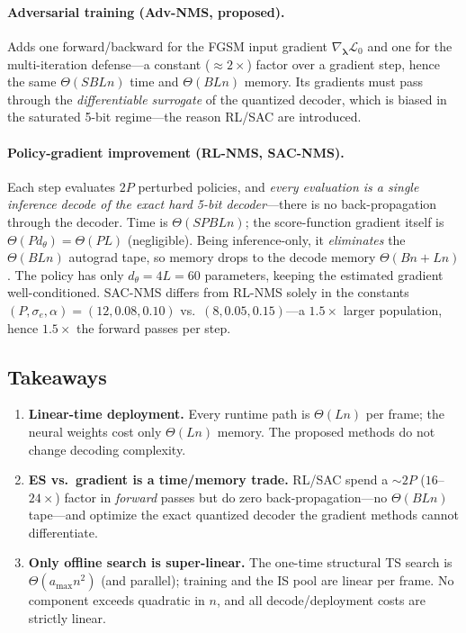\paragraph{Adversarial training (Adv-NMS, proposed).}
Adds one forward/backward for the FGSM input gradient
$\nabla_{\boldsymbol\lambda}\mathcal L_0$ and one for the multi-iteration
defense---a constant ($\approx\!2\times$) factor over a gradient step, hence the
same $\Theta(SBLn)$ time and $\Theta(BLn)$ memory. Its gradients must pass
through the \emph{differentiable surrogate} of the quantized decoder, which is
biased in the saturated 5-bit regime---the reason RL/SAC are introduced.

\paragraph{Policy-gradient improvement (RL-NMS, SAC-NMS).}
Each step evaluates $2P$ perturbed policies, and \emph{every evaluation is a
single inference decode of the exact hard 5-bit decoder}---there is no
back-propagation through the decoder. Time is $\Theta(SPBLn)$; the
score-function gradient itself is $\Theta(P d_\theta)=\Theta(PL)$ (negligible).
Being inference-only, it \emph{eliminates} the $\Theta(BLn)$ autograd tape, so
memory drops to the decode memory $\Theta(Bn+Ln)$. The policy has only
$d_\theta=4L=60$ parameters, keeping the estimated gradient well-conditioned.
SAC-NMS differs from RL-NMS solely in the constants
$(P,\sigma_e,\alpha)=(12,0.08,0.10)$ vs.\ $(8,0.05,0.15)$---a $1.5\times$ larger
population, hence $1.5\times$ the forward passes per step.

\subsection{Takeaways}
\begin{enumerate}
\item \textbf{Linear-time deployment.} Every runtime path is $\Theta(Ln)$ per
frame; the neural weights cost only $\Theta(Ln)$ memory. The proposed methods do
not change decoding complexity.
\item \textbf{ES vs.\ gradient is a time/memory trade.} RL/SAC spend a $\sim\!2P$
($16$--$24\times$) factor in \emph{forward} passes but do zero
back-propagation---no $\Theta(BLn)$ tape---and optimize the exact quantized
decoder the gradient methods cannot differentiate.
\item \textbf{Only offline search is super-linear.} The one-time structural TS
search is $\Theta(a_{\max}n^{2})$ (and parallel); training and the IS pool are
linear per frame. No component exceeds quadratic in $n$, and all
decode/deployment costs are strictly linear.
\end{enumerate}
